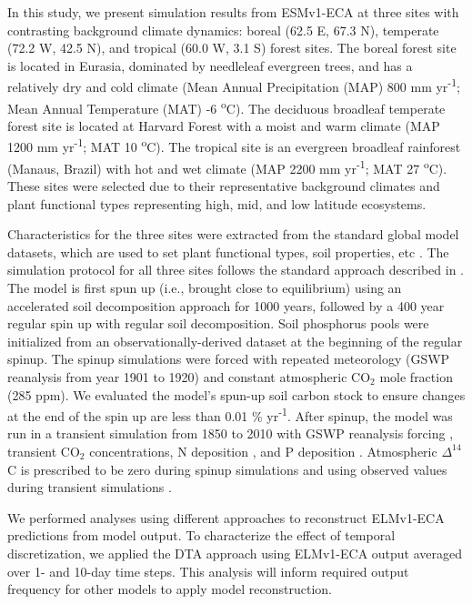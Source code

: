 \documentclass[draft]{agujournal2019}
\begin{document}
  In this study, we present simulation results from ESMv1-ECA at three sites with contrasting background climate dynamics: boreal (62.5 E, 67.3 N), temperate  (72.2 W, 42.5 N), and tropical (60.0 W, 3.1 S) forest sites. The boreal forest site is located in Eurasia, dominated by needleleaf evergreen trees, and has  a relatively dry and cold climate (Mean Annual Precipitation (MAP) 800 mm yr\textsuperscript{-1}; Mean Annual Temperature (MAT) -6 \textsuperscript{o}C). The deciduous broadleaf temperate forest site is located at Harvard Forest with a moist and warm climate (MAP 1200 mm yr\textsuperscript{-1}; MAT 10 \textsuperscript{o}C). The tropical site is an evergreen broadleaf rainforest (Manaus, Brazil) with hot and wet climate (MAP 2200 mm yr\textsuperscript{-1}; MAT 27 \textsuperscript{o}C). These sites were selected due to their representative background climates and plant functional types representing high, mid, and low latitude ecosystems.
    
    Characteristics for the three sites were extracted from the standard global model datasets, which are used to set plant functional types, soil properties, etc \cite{Zhu2019}. The simulation protocol for all three sites follows the standard approach described in . The model is first spun up (i.e., brought close to equilibrium) using an accelerated soil decomposition approach \cite{Koven2013} for 1000 years, followed by a 400 year regular spin up with regular soil decomposition. Soil phosphorus pools were initialized from an observationally-derived dataset \cite{Yang2013} at the beginning of the regular spinup. The spinup simulations were forced with repeated meteorology (GSWP reanalysis \cite{Dirmeyer2006} from year 1901 to 1920) and constant atmospheric CO$_2$ mole fraction (285 ppm). We evaluated the model's spun-up soil carbon stock to ensure changes at the end of the spin up are less than 0.01 \% yr\textsuperscript{-1}. After spinup, the model was run in a transient simulation from 1850 to 2010 with GSWP reanalysis forcing \cite{Dirmeyer2006}, transient CO$_2$ concentrations, N deposition \cite{Lamarque2005}, and P deposition \cite{Mahowald2008}. Atmospheric   $\Delta^{14}$C  is prescribed to be zero during spinup simulations and using observed values during transient simulations \cite{Levin2010}.
    
    We performed analyses using different approaches to reconstruct ELMv1-ECA predictions from model output. To characterize the effect of temporal discretization, we applied the DTA approach using ELMv1-ECA output averaged over 1- and 10-day time steps. This analysis will inform required output frequency for other models to apply model reconstruction. %
\end{document}
